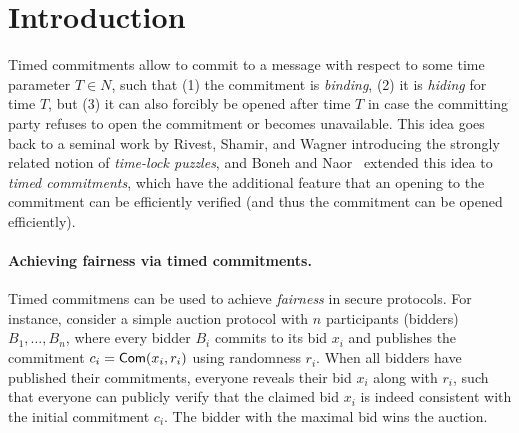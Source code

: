 \section{Introduction}\label{sec:intro}

Timed commitments allow to commit to a message with respect to some time parameter $T \in N$, such that (1) the commitment is \emph{binding}, (2) it is \emph{hiding} for time $T$, but (3) it can also forcibly be opened after time $T$ in case the committing party refuses to open the commitment or becomes unavailable. This idea goes back to a seminal work by Rivest, Shamir, and Wagner \cite{RSW96} introducing the strongly related notion of \emph{time-lock puzzles}, and Boneh and Naor~\cite{C:BonNao00} extended this idea to \emph{timed commitments}, which have the additional feature that an opening to the commitment can be efficiently verified (and thus the commitment can be opened efficiently).

\paragraph{Achieving fairness via timed commitments.}
Timed commitmens can be used to achieve \emph{fairness} in secure protocols. For instance, consider a simple auction protocol with $n$ participants (bidders) $B_1, \ldots, B_n$, where every bidder $B_i$ commits to its bid $x_i$ and publishes the commitment $c_i = \mathsf{Com}(x_i,r_i)$ using randomness $r_i$. When all bidders have published their commitments, everyone reveals their bid $x_i$ along with $r_i$, such that everyone can publicly verify that the claimed bid $x_i$ is indeed consistent with the initial commitment $c_i$. The bidder with the maximal bid wins the auction.

